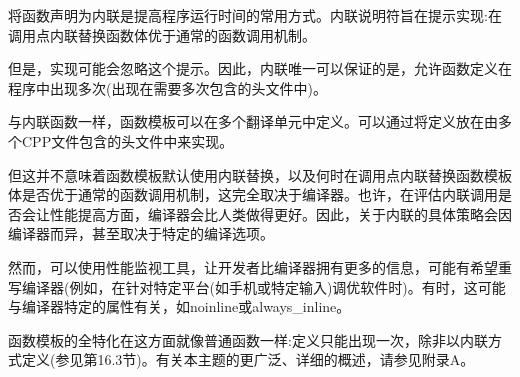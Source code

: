 将函数声明为内联是提高程序运行时间的常用方式。内联说明符旨在提示实现:在调用点内联替换函数体优于通常的函数调用机制。

但是，实现可能会忽略这个提示。因此，内联唯一可以保证的是，允许函数定义在程序中出现多次(出现在需要多次包含的头文件中)。

与内联函数一样，函数模板可以在多个翻译单元中定义。可以通过将定义放在由多个CPP文件包含的头文件中来实现。

但这并不意味着函数模板默认使用内联替换，以及何时在调用点内联替换函数模板体是否优于通常的函数调用机制，这完全取决于编译器。也许，在评估内联调用是否会让性能提高方面，编译器会比人类做得更好。因此，关于内联的具体策略会因编译器而异，甚至取决于特定的编译选项。

然而，可以使用性能监视工具，让开发者比编译器拥有更多的信息，可能有希望重写编译器(例如，在针对特定平台(如手机或特定输入)调优软件时)。有时，这可能与编译器特定的属性有关，如noinline或always\_inline。

函数模板的全特化在这方面就像普通函数一样:定义只能出现一次，除非以内联方式定义(参见第16.3节)。有关本主题的更广泛、详细的概述，请参见附录A。

























